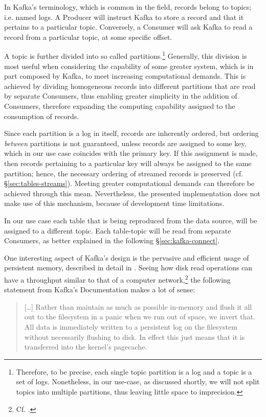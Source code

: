 In Kafka's terminology, which is common in the field, records belong to topics; i.e. named logs.
A Producer will instruct Kafka to store a record and that it pertains to a particular topic.
Conversely, a Consumer will ask Kafka to read a record from a particular topic, at some specific offset.

A topic is further divided into so called partitions.\footnote{%
	Therefore, to be precise, each single topic partition is a log and a topic is a set of logs.
	Nonetheless, in our use-case, as discussed shortly, we will not split topics into multiple partitions, thus leaving little space to imprecision.
}
Generally, this division is most useful when considering the capability of some greater system, which is in part composed by Kafka, to meet increasing computational demands.
This is achieved by dividing homogeneous records into different partitions that are read by separate Consumers, thus enabling greater simplicity in the addition of Consumers, therefore expanding the computing capability assigned to the consumption of records.

Since each partition is a log in itself, records are inherently ordered, but ordering \emph{between} partitions is not guaranteed, unless records are assigned to some key, which in our use case coincides with the primary key.
If this assignment is made, then records pertaining to a particular key will always be assigned to the same partition; hence, the necessary ordering of streamed records is preserved (cf. \S \ref{sec:tables-streams}).
Meeting greater computational demands can therefore be achieved through this mean.
Nevertheless, the presented implementation does not make use of this mechanism, because of development time limitations.

In our use case each table that is being reproduced from the data source, will be assigned to a different topic.
Each table-topic will be read from separate Consumers, as better explained in the following \S \ref{sec:kafka-connect}.

One interesting aspect of Kafka's design is the pervasive and efficient usage of persistent memory, described in detail in \cite[\S 4.2, and \S 4.3]{kafka-docs}.
Seeing how disk read operations can have a throughput similar to that of a computer network,\footnote{%
	Cf. \cite{pathologies-big-data}.
} the following statement from Kafka's Documentation makes a lot of sense:
\begin{quote}
	[\ldots] Rather than maintain as much as possible in-memory and flush it all out to the filesystem in a panic when we run out of space, we invert that. All data is immediately written to a persistent log on the filesystem without necessarily flushing to disk. In effect this just means that it is transferred into the kernel's pagecache.
\end{quote}

